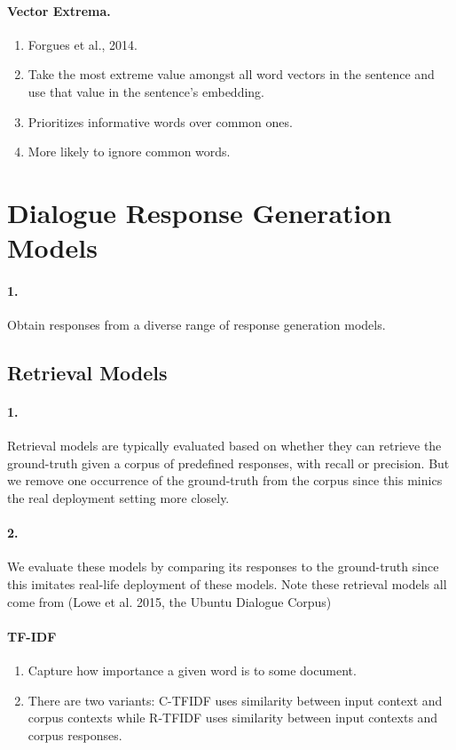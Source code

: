 \documentclass[runningheads]{llncs}
\begin{document}
\paragraph{Vector Extrema.}
\begin{enumerate}
    \item Forgues et al., 2014.
    \item Take the most extreme value amongst all word vectors in the sentence
    and use that value in the sentence's embedding.
    \item Prioritizes informative words over common ones.
    \item More likely to ignore common words.
\end{enumerate}

\section{Dialogue Response Generation Models}
\paragraph{1.}
Obtain responses from a diverse range of response generation models.

\subsection{Retrieval Models}
\paragraph{1.}
Retrieval models are typically evaluated based on whether they can retrieve
the ground-truth given a corpus of predefined responses, with recall or precision.
But we remove one occurrence of the ground-truth from the corpus since this minics
the real deployment setting more closely.

\paragraph{2.}
We evaluate these models by comparing its responses to the ground-truth since
this imitates real-life deployment of these models.
Note these retrieval models all come from
(Lowe et al. 2015, the Ubuntu Dialogue Corpus)

\paragraph{TF-IDF}
\begin{enumerate}
    \item Capture how importance a given word is to some document.
    \item There are two variants: C-TFIDF uses similarity between input context
    and corpus contexts while R-TFIDF uses similarity between input contexts and
    corpus responses.
\end{enumerate}
\end{document}
